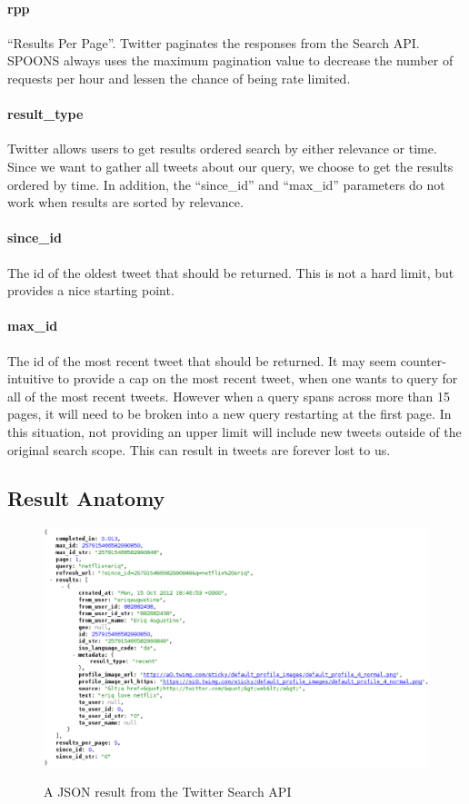 \documentclass[12pt]{ucthesis}
\newcommand{\captionfonts}{\small\bf\ssp}
\begin{document}
\paragraph{rpp}
``Results Per Page''. Twitter paginates the responses from the Search API. SPOONS always uses the maximum pagination value to decrease the number of requests per hour and lessen the chance of being rate limited.

\paragraph{result\_type}
Twitter allows users to get results ordered search by either relevance or time. Since we want to gather all tweets about
our query, we choose to get the results ordered by time. In addition, the ``since\_id'' and ``max\_id''
parameters do not work when results are sorted by relevance.

\paragraph{since\_id}
The id of the oldest tweet that should be returned. This is not a hard limit, but provides a nice starting point.

\paragraph{max\_id}
The id of the most recent tweet that should be returned. It may seem counter-intuitive to provide a cap on the
most recent tweet, when one wants to query for all of the most recent tweets. However when a query spans across
more than 15 pages, it will need to be broken into a new query restarting at the first page. In this situation,
not providing an upper limit will include new tweets outside of the original search scope. This can result in tweets
are forever lost to us.

\subsection{Result Anatomy}
\begin{figure}
   \begin{center}
      \includegraphics[width=140mm]{images/api_result.eps}
      \captionfonts
      \caption[Twitter Search API Result]{A JSON result from the Twitter Search API}
      \label{fig:apiRes}
   \end{center}
\end{figure}
\end{document}
